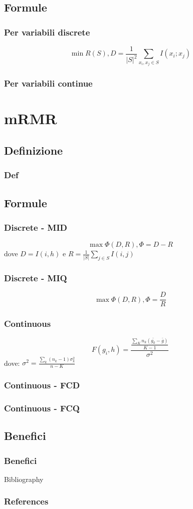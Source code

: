 \documentclass{beamer}
\begin{document}
\subsection{Formule}
\begin{frame}
	\frametitle{Per variabili discrete}
	$$\min R(S), D= \frac{1}{|S|^2} \sum\limits_{x_i,x_j \in S} I (x_i;x_j)$$
\end{frame}
\begin{frame}
	\frametitle{Per variabili continue}
\end{frame}


\section{mRMR}
\subsection{Definizione}
\begin{frame}
	\frametitle{Def}
\end{frame}

\subsection{Formule}
\begin{frame}
	\frametitle{Discrete - MID}
	$$\max \Phi(D,R), \Phi = D - R$$
	dove $D=I(i,h)$ e $R=\frac{1}{|S|}\sum\limits_{j \in S}I(i,j)$
\end{frame}

\begin{frame}
	\frametitle{Discrete - MIQ}
	$$\max \Phi(D,R), \Phi = \frac{D}{R}$$
\end{frame}
\begin{frame}
	\frametitle{Continuous}
	$$ F(g_i,h) = \frac{\frac{\sum\limits_{K}{n_k(\bar{g_k}-\bar{g})}}{K-1}}{\sigma^2}$$
	dove: $\sigma^2=\frac{ \sum\limits_{k}{(n_k-1)\sigma^2_k}}{n-K}$
\end{frame}
\begin{frame}
	\frametitle{Continuous - FCD}
\end{frame}

\begin{frame}
	\frametitle{Continuous - FCQ}
\end{frame}

\subsection{Benefici}
\begin{frame}
	\frametitle{Benefici}
\end{frame}

\begin{frame}{Bibliography}
	\frametitle{References}
	
	
\end{frame}
\end{document}
